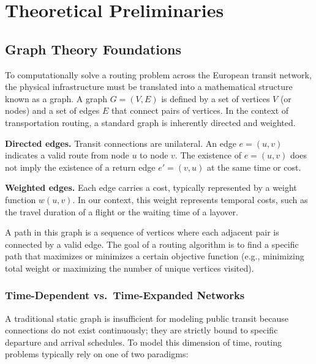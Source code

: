 \chapter{Theoretical Preliminaries}
\label{chap:preliminaries}

\section{Graph Theory Foundations}
\label{sec:graph_theory}

To computationally solve a routing problem across the European transit network, the physical infrastructure must be translated into a mathematical structure known as a graph. A graph $G = (V, E)$ is defined by a set of vertices $V$ (or nodes) and a set of edges $E$ that connect pairs of vertices.
In the context of transportation routing, a standard graph is inherently directed and weighted.

\medskip

\textbf{Directed edges.}
Transit connections are unilateral. An edge $e = (u, v)$ indicates a valid route from node $u$ to node $v$. The existence of $e = (u, v)$ does not imply the existence of a return edge $e' = (v, u)$ at the same time or cost.

\textbf{Weighted edges.}
Each edge carries a cost, typically represented by a weight function $w(u, v)$. In our context, this weight represents temporal costs, such as the travel duration of a flight or the waiting time of a layover.

\medskip

A path in this graph is a sequence of vertices where each adjacent pair is connected by a valid edge. The goal of a routing algorithm is to find a specific path that maximizes or minimizes a certain objective function (e.g., minimizing total weight or maximizing the number of unique vertices visited).

\subsection{Time-Dependent vs.\ Time-Expanded Networks}
\label{subsec:time_expanded}

A traditional static graph is insufficient for modeling public transit because connections do not exist continuously; they are strictly bound to specific departure and arrival schedules. To model this dimension of time, routing problems typically rely on one of two paradigms:

\medskip

